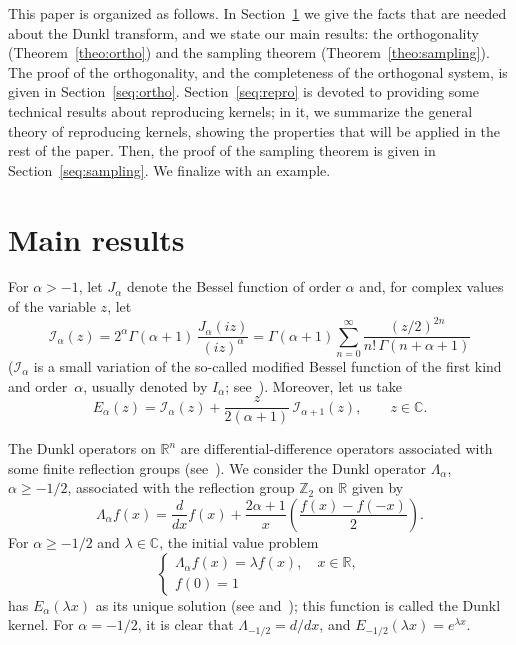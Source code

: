 \documentclass[11pt]{amsart}
\theoremstyle{plain}
\begin{document}
This paper is organized as follows. In Section~\ref{seq:main} we give the facts that are needed about the Dunkl transform, and we state our main results: the orthogonality (Theorem~\ref{theo:ortho}) and the sampling theorem (Theorem~\ref{theo:sampling}).
The proof of the orthogonality, and the completeness of the orthogonal system, is given in Section~\ref{seq:ortho}.
Section~\ref{seq:repro} is devoted to providing some technical results about reproducing kernels; in it, we summarize the general theory of reproducing kernels, showing the properties
that will be applied in the rest of the paper.
Then, the proof of the sampling theorem is given in Section~\ref{seq:sampling}.
We finalize with an example.

\section{Main results}
\label{seq:main}

For $\alpha > -1$, let $J_\alpha$ denote the Bessel function of order $\alpha$ and,
for complex values of the variable $z$, let
\[
  \mathcal{I}_\alpha(z)
  = 2^\alpha \Gamma(\alpha+1)\, \frac{J_\alpha(iz)}{(iz)^\alpha}
  = \Gamma(\alpha+1) \sum_{n=0}^\infty \frac{(z/2)^{2n}}{n!\,\Gamma(n+\alpha+1)}
\]
($\mathcal{I}_\alpha$ is a small variation of the so-called modified Bessel function of the first kind and order~$\alpha$, usually denoted by $I_\alpha$; see~\cite{Watson}).
Moreover, let us take
\[
  E_\alpha(z) = \mathcal{I}_\alpha(z) + \frac{z}{2(\alpha+1)}\,
    \mathcal{I}_{\alpha+1}(z),
  \qquad z \in \mathbb{C}.
\]

The Dunkl operators on $\mathbb{R}^n$ are differential-difference operators associated with some finite reflection groups (see~\cite{Dunkl}). We consider the Dunkl operator $\Lambda_\alpha$, $\alpha \ge -1/2$, associated with the reflection group $\mathbb{Z}_2$ on $\mathbb{R}$ given by
\begin{equation*}
  \Lambda_\alpha f(x) = \frac{d}{dx}f(x)
    + \frac{2\alpha+1}{x} \left(\frac{f(x)-f(-x)}{2}\right).
\end{equation*}
For $\alpha \ge -1/2$ and $\lambda\in \mathbb{C}$, the initial value problem
\begin{equation}
\label{eq:dunklproblem}
\begin{cases}
  \Lambda_\alpha f(x) = \lambda f(x),\quad x\in \mathbb{R},\\
  f(0) = 1
\end{cases}
\end{equation}
has $E_\alpha(\lambda x)$ as its unique solution (see \cite{Dunkl2} and~\cite{Jeu});
this function is called the Dunkl kernel.
For $\alpha=-1/2$, it is clear that $\Lambda_{-1/2} = d/dx$, and $E_{-1/2}(\lambda x) = e^{\lambda x}$.
\end{document}
